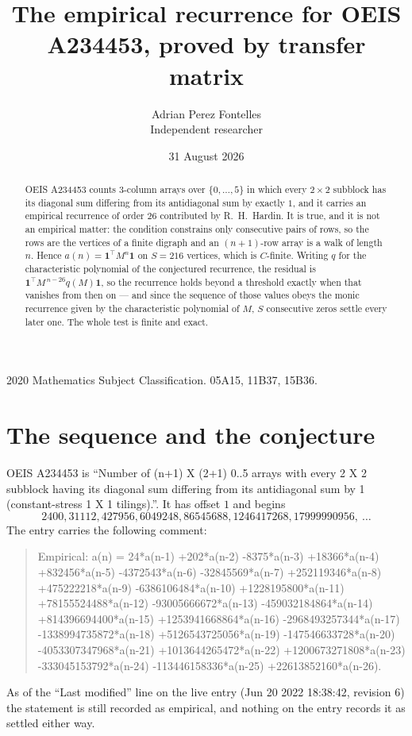 \documentclass[11pt,a4paper]{article}
\title{The empirical recurrence for OEIS A234453, proved by transfer matrix}
\author{Adrian Perez Fontelles\\ \small Independent researcher}
\date{31 August 2026}
\theoremstyle{plain}
\theoremstyle{definition}
\begin{document}
\maketitle

\begin{abstract}
OEIS A234453 counts $3$-column arrays over $\{0,\dots,5\}$ in which every
$2\times2$ subblock has its diagonal sum differing from its antidiagonal sum by
exactly $1$, and it
carries an empirical recurrence of order $26$ contributed by R.~H.~Hardin. It is true,
and it is not an empirical matter: the condition constrains only consecutive pairs of rows,
so the rows are the vertices of a finite digraph and an $(n+1)$-row array is a walk of
length $n$. Hence $a(n)=\mathbf{1}^{\!\top}M^{n}\mathbf{1}$ on $S=216$ vertices, which
is $C$-finite. Writing $q$ for the characteristic polynomial of the conjectured recurrence,
the residual is $\mathbf{1}^{\!\top}M^{\,n-26}q(M)\mathbf{1}$, so the recurrence
holds beyond a threshold exactly when that vanishes from then on --- and since the sequence
of those values obeys the monic recurrence given by the characteristic polynomial of $M$,
$S$ consecutive zeros settle every later one. The whole test is finite and exact.
\end{abstract}

\noindent\small 2020 Mathematics Subject Classification. 05A15, 11B37, 15B36.\normalsize

\section{The sequence and the conjecture}

OEIS A234453 is ``Number of (n+1) X (2+1) 0..5 arrays with every 2 X 2 subblock having its diagonal sum differing from its antidiagonal sum by 1 (constant-stress 1 X 1 tilings).''. It has offset
$1$ and begins
\[
2400, 31112, 427956, 6049248, 86545688, 1246417268, 17999990956,\ \dots
\]
The entry carries the following comment:
\begin{quote}\small
Empirical: a(n) = 24*a(n-1) +202*a(n-2) -8375*a(n-3) +18366*a(n-4) +832456*a(n-5) -4372543*a(n-6) -32845569*a(n-7) +252119346*a(n-8) +475222218*a(n-9) -6386106484*a(n-10) +1228195800*a(n-11) +78155524488*a(n-12) -93005666672*a(n-13) -459032184864*a(n-14) +814396694400*a(n-15) +1253941668864*a(n-16) -2968493257344*a(n-17) -1338994735872*a(n-18) +5126543725056*a(n-19) -147546633728*a(n-20) -4053307347968*a(n-21) +1013644265472*a(n-22) +1200673271808*a(n-23) -333045153792*a(n-24) -113446158336*a(n-25) +22613852160*a(n-26).
\end{quote}
As of the ``Last modified'' line on the live entry (Jun 20 2022 18:38:42, revision 6) the statement is
still recorded as empirical, and nothing on the entry records it as settled either way.
\end{document}
